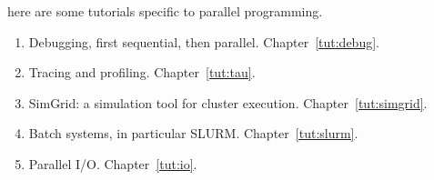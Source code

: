 
here are some tutorials specific to parallel programming.
\begin{enumerate}
\item Debugging, first sequential, then parallel. Chapter~\ref{tut:debug}.
\item Tracing and profiling. Chapter~\ref{tut:tau}.
\item SimGrid: a simulation tool for cluster execution. Chapter~\ref{tut:simgrid}.
\item Batch systems, in particular \ac{SLURM}. Chapter~\ref{tut:slurm}.
\item Parallel I/O. Chapter~\ref{tut:io}.
\end{enumerate}
